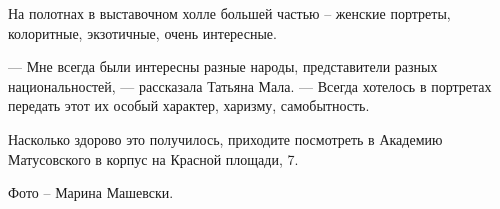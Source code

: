
На полотнах в выставочном холле большей частью – женские портреты, колоритные,
экзотичные, очень интересные.

— Мне всегда были интересны разные народы, представители разных
национальностей, — рассказала Татьяна Мала. — Всегда хотелось в портретах
передать этот их особый характер, харизму, самобытность.

Насколько здорово это получилось, приходите посмотреть в Академию Матусовского
в корпус на Красной площади, 7.

Фото – Марина Машевски.
